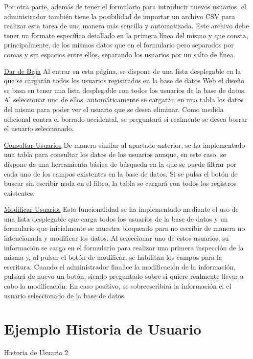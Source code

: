 Por otra parte, además de tener el formulario para introducir nuevos usuarios, el administrador también tiene la posibilidad de importar un archivo \acs{CSV} para realizar esta tarea de una manera más sencilla y automatizada. Este archivo debe tener un formato específico detallado en la primera línea del mismo y que consta, principalmente, de los mismos datos que en el formulario pero separados por comas y sin espacios entre ellos, separando los usuarios por un salto de línea.

\noindent \underline{Dar de Baja} \newline
Al entrar en esta página, se dispone de una lista desplegable en la que se cargarán todos los usuarios registrados en la base de datos Web el diseño se basa en tener una lista desplegable con todos los usuarios de la base de datos. Al seleccionar uno de ellos, automáticamente se cargarán en una tabla los datos del mismo para poder ver el usuario que se desea eliminar. Como medida adicional contra el borrado accidental, se preguntará si realmente se desea borrar el usuario seleccionado.

\noindent \underline{Consultar Usuarios} \newline
De manera similar al apartado anterior, se ha implementado una tabla para consultar los datos de los usuarios aunque, en este caso, se dispone de una herramienta básica de búsqueda en la que se puede filtrar por cada uno de los campos existentes en la base de datos. Si se pulsa el botón de buscar sin escribir nada en el filtro, la tabla se cargará con todos los registros existentes.

\noindent \underline{Modificar Usuarios} \newline
Esta funcionalidad se ha implementado mediante el uso de una lista desplegable que carga todos los usuarios de la base de datos y un formulario que inicialmente se muestra bloqueado para no escribir de manera no intencionada y modificar los datos. Al seleccionar uno de estos usuarios, su información se carga en el formulario para realizar una primera inspección de la misma y, al pulsar el botón de modificar, se habilitan los campos para la escritura. Cuando el administrador finalice la modificación de la información, pulsará de nuevo un botón, siendo preguntado sobre si quiere realmente llevar a cabo la modificación. En caso positivo, se sobreescribirá la información el el usuario seleccionado de la base de datos.

\section{Ejemplo Historia de Usuario}

\begin{table}[hp]
	\centering
	{\small
		
	}
	\caption[Historia de Usuario 2]
	{Historia de Usuario 2}
	\label{tab:historia2}
\end{table}